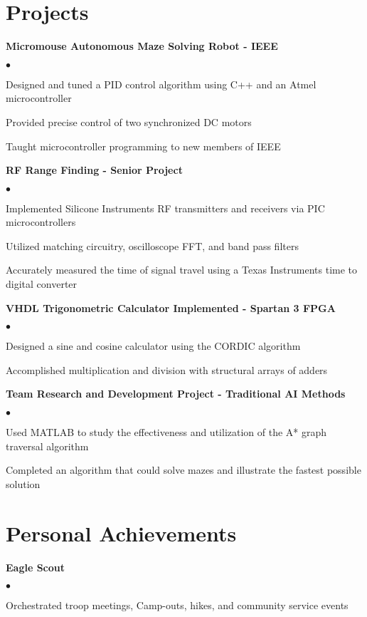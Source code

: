 \documentclass[margin,line]{res}
\newenvironment{list2}{
  \begin{list}{$\bullet$}{%
      \setlength{\itemsep}{0in}
      \setlength{\parsep}{0in} \setlength{\parskip}{0in}
      \setlength{\topsep}{0in} \setlength{\partopsep}{0in}
      \setlength{\leftmargin}{0.2in}}}{\end{list}}
\begin{document}
\begin{resume}
\section{\sc Projects}
{\bf Micromouse Autonomous Maze Solving Robot - IEEE}
\begin{list2}
\item Designed and tuned a PID control algorithm using C++ and an Atmel microcontroller 
\item Provided precise control of two synchronized DC motors
\item Taught microcontroller programming to new members of IEEE 
\end{list2}
{\bf RF Range Finding - Senior Project}
\begin{list2}
\item Implemented Silicone Instruments RF transmitters and receivers via PIC microcontrollers
\item Utilized matching circuitry, oscilloscope FFT, and band pass filters 
\item Accurately measured the time of signal travel using a Texas Instruments time to digital converter 
\end{list2}
{\bf VHDL Trigonometric Calculator Implemented - Spartan 3 FPGA}
\begin{list2}
\item Designed a sine and cosine calculator using the CORDIC algorithm
\item Accomplished multiplication and division with structural arrays of adders
\end{list2}
{\bf Team Research and Development Project - Traditional AI Methods}
\begin{list2}
\item Used MATLAB to study the effectiveness and utilization of the A* graph traversal algorithm 
\item Completed an algorithm that could solve mazes and illustrate the fastest possible solution
\end{list2}



\section{\sc Personal Achievements}
{\bf Eagle Scout}
\begin{list2}
\item Orchestrated troop meetings, Camp-outs, hikes, and community service events  
\end{list2}




\end{resume}
\end{document}
